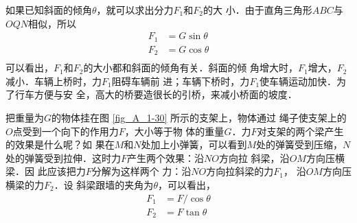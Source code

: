    如果已知斜面的倾角$\theta$，就可以求出分力$F_1$和$F_2$的大
小．由于直角三角形$ABC$与$OQN$相似，所以
\[\begin{split} 
F_1&= G\sin\theta \\
F_2&= G\cos\theta \\
\end{split}  \]
可以看出，$F_1$和$F_2$的大小都和斜面的倾角有关．斜面的倾
角增大时，$F_1$增大，$F_2$减小．车辆上桥时，力$F_1$阻碍车辆前
进；车辆下桥时，力$F_1$使车辆运动加快．为了行车方便与安
全，高大的桥要造很长的引桥，来减小桥面的坡度．

    把重量为$G$的物体挂在图 \ref{fig_A_1-30} 所示的支架上，物体通过
绳子使支架上的$O$点受到一个向下的作用力$F$，大小等于物
体的重量$G$．力$F$对支架的两个梁产生的效果是什么呢？如
果在$M$和$N$处加上小弹簧，可以看到$M$处的弹簧受到压缩，$N$
处的弹簧受到拉伸．这时力$F$产生两个效果：沿$NO$方向拉
斜梁，沿$OM$方向压横梁．因
此应该把力$F$分解为这样两个
力：沿$NO$方向拉斜梁的力$F_1$，
沿$OM$方向压横梁的力$F_2$．设
斜梁跟墙的夹角为$\theta$，可以看出，
\[\begin{split} 
F_1&= F/\cos\theta \\
F_2&= F\tan\theta \\
\end{split}  \]

